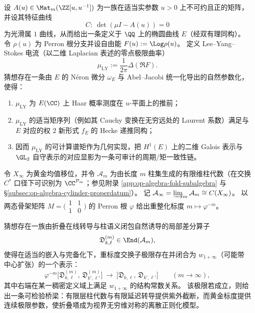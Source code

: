 \begin{conjecture}\label{conj:discussion-leyang-stokes-modularity-langlands}
设 \(A(u)\in\Mat_m(\ZZ[u,u^{-1}])\) 为一族在适当实参数 \(u>0\) 上不可约且正的矩阵，并设其特征曲线
\[
  C:\ \det(\mu I-A(u))=0
\]
为光滑属 \(1\) 曲线，从而给出一条定义于 \(\QQ\) 上的椭圆曲线 \(E\)（经双有理同构）。
令 \(\rho(u)\) 为 Perron 根分支并设自由能 \(F(u):=\Log\rho(u)\)。
定义 Lee--Yang--Stokes 电流（以二维 Laplacian 表述的零点极限曲率）
\[
  \mu_{\mathrm{LY}}:=\frac1{2\pi}\Delta(\Re F).
\]
猜想存在一条由 \(E\) 的 N\'eron 微分 \(\omega_E\) 与 Abel--Jacobi 统一化导出的自然参数化，使得：
\begin{enumerate}
  \item \(\mu_{\mathrm{LY}}\) 为 \(E(\CC)\) 上 Haar 概率测度在 \(u\)-平面上的推前；
  \item \(\mu_{\mathrm{LY}}\) 的适当矩序列（例如其 Cauchy 变换在无穷远处的 Laurent 系数）满足与 \(E\) 对应的权 \(2\) 新形式 \(f_E\) 的 Hecke 递推同构；
  \item 因而 \(\mu_{\mathrm{LY}}\) 的可计算谱矩作为几何实现，把 \(H^1(E)\) 上的二维 Galois 表示与 \(\GL_2\) 自守表示的对应显影为一条可审计的周期/矩一致性链。
\end{enumerate}
\end{conjecture}

\begin{conjecture}\label{conj:discussion-fold-tower-w1infty-discretization}
令 \(X_\infty\) 为黄金均值移位，并令 \(\mathcal A_m\) 为由长度 \(m\) 柱集生成的有限维柱代数（在交换 \(C^\ast\) 口径下可识别为 \(\CC^{\mathcal P_m}\)；参见附录 \ref{app:op-algebra-fold-subalgebra} 与 \S\ref{subsec:op-algebra-cylinder-properdatum}）。
记 \(\mathcal A_\infty=\varinjlim_m \mathcal A_m\cong C(X_\infty)\)。
以两态骨架矩阵 \(M=\bigl(\begin{smallmatrix}1&1\\[2pt]1&0\end{smallmatrix}\bigr)\) 的 Perron 根 \(\varphi\) 给出重整化标度 \(m\mapsto \varphi^{-m}\)。
\par
猜想存在一族由折叠在线转导与柱语义闭包自然诱导的局部差分算子
\[
\mathfrak D^{(m)}_{k,\ell}\in \End(\mathcal A_m),
\]
使得在适当的嵌入与完备化下，重标度交换子极限存在并闭合为 \(w_{1+\infty}\)（可能带中心扩张）的一个表示：
\[
\varphi^{-m}\bigl[\mathfrak D^{(m)}_{k,\ell},\,\mathfrak D^{(m)}_{k',\ell'}\bigr]
\ \longrightarrow\
\bigl[\mathfrak D_{k,\ell},\,\mathfrak D_{k',\ell'}\bigr]
\qquad(m\to\infty),
\]
其中右端在某一稠密定义域上满足 \(w_{1+\infty}\) 的结构常数关系。
该极限若成立，则给出一条可检验桥梁：有限层柱代数与有限延迟转导提供紫外截断，而黄金标度提供连续极限参数，使折叠塔成为视界无穷维对称的离散正则化模型。
\end{conjecture}
